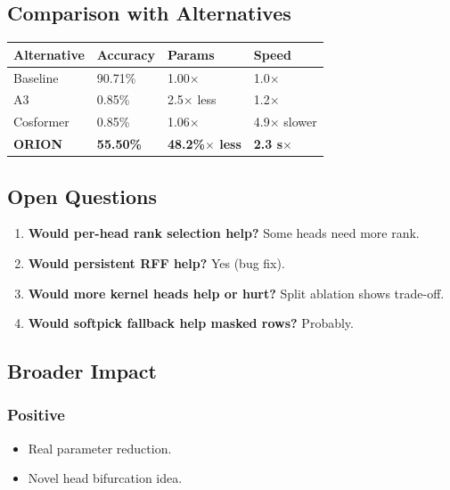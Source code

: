\subsection{Comparison with Alternatives}

\begin{table}[H]
\centering
\small
\begin{tabular}{llll}
\toprule
\textbf{Alternative} & \textbf{Accuracy} & \textbf{Params} & \textbf{Speed} \\
\midrule
Baseline & 90.71\% & 1.00$\times$ & 1.0$\times$ \\
A3 & 0.85\% & 2.5$\times$ less & 1.2$\times$ \\
Cosformer & 0.85\% & 1.06$\times$ & 4.9$\times$ slower \\
\textbf{ORION} & \textbf{55.50\%} & \textbf{48.2\%$\times$ less} & \textbf{2.3 s$\times$} \\
\bottomrule
\end{tabular}
\end{table}

\subsection{Open Questions}

\begin{enumerate}
\item \textbf{Would per-head rank selection help?} Some heads need more rank.
\item \textbf{Would persistent RFF help?} Yes (bug fix).
\item \textbf{Would more kernel heads help or hurt?} Split ablation shows trade-off.
\item \textbf{Would softpick fallback help masked rows?} Probably.

\end{enumerate}
\subsection{Broader Impact}

\subsubsection{Positive}

\begin{itemize}
\item Real parameter reduction.
\item Novel head bifurcation idea.

\end{itemize}
